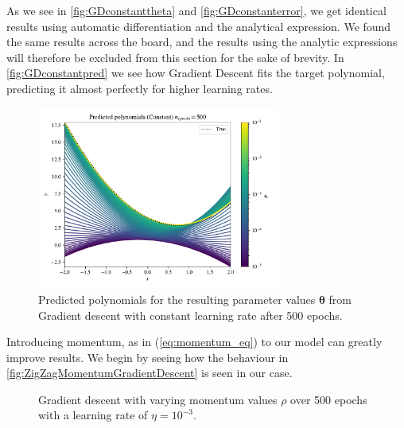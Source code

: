 \documentclass{article}
\theoremstyle{definition}
\begin{document}
As we see in \autoref{fig:GDconstanttheta} and \autoref{fig:GDconstanterror}, we get identical results using automatic differentiation and the analytical expression. We found the same results across the board, and the results using the analytic expressions will therefore be excluded from this section for the sake of brevity. In \autoref{fig:GDconstantpred} we see how Gradient Descent fits the target polynomial, predicting it almost perfectly for higher learning rates.

\begin{figure}[H]%
    \centering
    \includegraphics[width=8cm]{Project2/figures/polynomial_grad/OLS_autodiff/constant_prediction.pdf}
    \caption{Predicted polynomials for the resulting parameter values $\boldsymbol{\theta}$ from Gradient descent with constant learning rate after 500 epochs.}
    \label{fig:GDconstantpred}
\end{figure}

Introducing momentum, as in (\ref{eq:momentum_eq}) to our model can greatly improve results. We begin by seeing how the behaviour in \autoref{fig:ZigZagMomentumGradientDescent} is seen in our case.

\begin{figure}[H]%
    \centering
    \qquad
    \caption{Gradient descent with varying momentum values $\rho$ over 500 epochs with a learning rate of $\eta = 10^{-3}$.}%
    \label{fig:GDmomentumrho}%
\end{figure}
\end{document}

